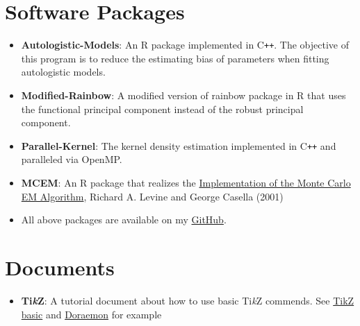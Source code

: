 \documentclass[a4paper,10pt,dvipdfmx]{article}
\begin{document}
\section*{Software Packages}
\begin{itemize}
  \item \textbf{Autologistic-Models}: An \textsf{R} package implemented in \textsf{C}\texttt{++}. The objective of this program is to reduce the estimating bias of parameters when fitting autologistic models.
  \item \textbf{Modified-Rainbow}: A modified version of rainbow package in \textsf{R} that uses the functional principal component instead of the robust principal component.
  \item \textbf{Parallel-Kernel}: The kernel density estimation implemented in \textsf{C}\texttt{++} and paralleled via OpenMP.
  \item \textbf{MCEM}: An \textsf{R} package that realizes the \href{https://www.jstor.org/stable/1391097}{Implementation of the Monte Carlo EM Algorithm}, Richard A. Levine and George Casella (2001)
  \item All above packages are available on my \href{https://github.com/Chris7462}{GitHub}.
\end{itemize}

\section*{Documents}
\begin{itemize}
  \item \textbf{Ti\textit{k}Z}: A tutorial document about how to use basic Ti\textit{k}Z commends. See \href{https://github.com/Chris7462/TikZ/blob/master/TikZ_basic.pdf}{TikZ basic} and \href{https://github.com/Chris7462/TikZ/blob/master/Examples/Doraemon.pdf}{Doraemon} for example

\end{itemize}
\end{document}
